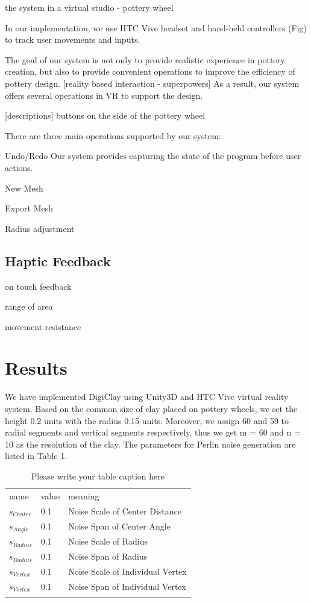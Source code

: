 the system in a virtual studio - pottery wheel

In our implementation, we use HTC Vive headset and hand-held controllers (Fig) to track user movements and inputs.

The goal of our system is not only to provide realistic experience in pottery creation, but also to provide convenient operations to improve the efficiency of pottery design. 
[reality based interaction - superpowers]
As a result, our system offers several operations in VR to support the design.

[descriptions]
buttons on the side of the pottery wheel

There are three main operations supported by our system:

Undo/Redo
Our system provides  capturing the state of the program before user actions.

New Mesh

Export Mesh

Radius adjustment

\subsection{Haptic Feedback}
\label{sec:4.4}

on touch feedback

range of area

movement resistance


\section{Results}
\label{sec:5}
We have implemented DigiClay using Unity3D and HTC Vive virtual reality system. 
Based on the common size of clay placed on pottery wheels, we set the height 0.2 units with the radius 0.15 units. Moreover, we assign 60 and 59 to radial segments and vertical segments respectively, thus we get m = 60 and n = 10 as the resolution of the clay. The parameters for Perlin noise generation are listed in Table 1.
\begin{table}
\caption{Please write your table caption here}
\label{tab:1}       %
\begin{tabular}{lll}
\hline\noalign{\smallskip}
name & value & meaning  \\
\noalign{\smallskip}\hline\noalign{\smallskip}
$s_{Center}$ & 0.1 & Noise Scale of Center Distance \\
$s_{Angle}$ & 0.1 & Noise Span of Center Angle \\
$s_{Radius}$ & 0.1 & Noise Scale of Radius \\
$s_{Radius}$ & 0.1 & Noise Span of Radius \\
$s_{Vertex}$ & 0.1 & Noise Scale of Individual Vertex \\
$s_{Vertex}$ & 0.1 & Noise Span of Individual Vertex \\
\noalign{\smallskip}\hline
\end{tabular}
\end{table}

